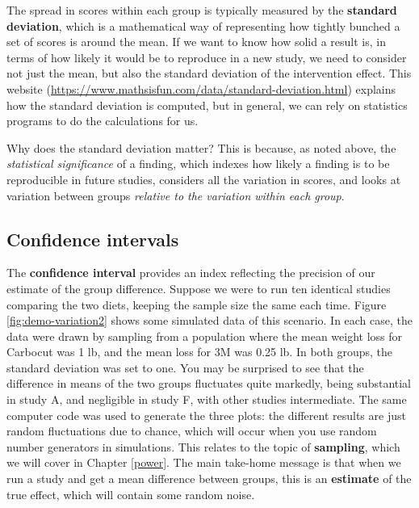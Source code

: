 \documentclass{krantz}
\begin{document}
The spread in scores within each group is typically measured by the \textbf{standard deviation}, which is a mathematical way of representing how tightly bunched a set of scores is around the mean. If we want to know how solid a result is, in terms of how likely it would be to reproduce in a new study, we need to consider not just the mean, but also the standard deviation of the intervention effect. This website (\url{https://www.mathsisfun.com/data/standard-deviation.html}) explains how the standard deviation is computed, but in general, we can rely on statistics programs to do the calculations for us.

Why does the standard deviation matter? This is because, as noted above, the \emph{statistical significance} of a finding, which indexes how likely a finding is to be reproducible in future studies, considers all the variation in scores, and looks at variation between groups \emph{relative to the variation within each group}.

\hypertarget{confidence-intervals}{%
\subsection{Confidence intervals}\label{confidence-intervals}}

The \textbf{confidence interval}  provides an index reflecting the precision of our estimate of the group difference. Suppose we were to run ten identical studies comparing the two diets, keeping the sample size the same each time. Figure \ref{fig:demo-variation2} shows some simulated data of this scenario. In each case, the data were drawn by sampling from a population where the mean weight loss for Carbocut was 1 lb, and the mean loss for 3M was 0.25 lb. In both groups, the standard deviation was set to one. You may be surprised to see that the difference in means of the two groups fluctuates quite markedly, being substantial in study A, and negligible in study F, with other studies intermediate. The same computer code was used to generate the three plots: the different results are just random fluctuations due to chance, which will occur when you use random number generators in simulations. This relates to the topic of \textbf{sampling}, which we will cover in Chapter \ref{power}. The main take-home message is that when we run a study and get a mean difference between groups, this is an \textbf{estimate} of the true effect, which will contain some random noise.
\end{document}

